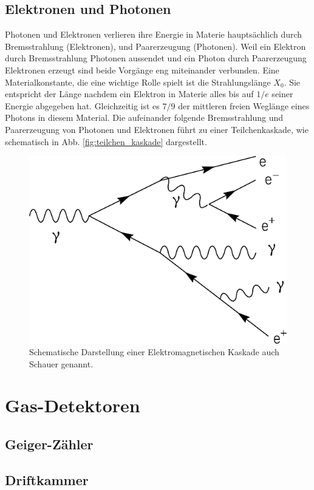 \subsection{Elektronen und Photonen}
Photonen und Elektronen verlieren ihre Energie in Materie hauptsächlich durch Bremsstrahlung (Elektronen), und Paarerzeugung (Photonen). Weil ein Elektron durch Bremsstrahlung Photonen aussendet und ein Photon durch Paarerzeugung Elektronen erzeugt sind beide Vorgänge eng miteinander verbunden. Eine Materialkonstante, die eine wichtige Rolle spielt ist die Strahlungslänge $X_0$. Sie entspricht der Länge nachdem ein Elektron in Materie alles bis auf $1/e$ seiner Energie abgegeben hat. Gleichzeitig ist es $7/9$ der mittleren freien Weglänge eines Photons in diesem Material. Die aufeinander folgende Bremsstrahlung und Paarerzeugung von Photonen und Elektronen führt zu einer Teilchenkaskade, wie schematisch in Abb. \ref{fig:teilchen_kaskade} dargestellt.
\begin{figure}
\centering
\includegraphics[]{./input/Schematic_of_a_particle_shower.pdf}\caption{Schematische Darstellung einer Elektromagnetischen Kaskade auch Schauer genannt\cite{emKaskade}.}
\end{figure}

\section{Gas-Detektoren}
\subsection{Geiger-Zähler}
\subsection{Driftkammer}

